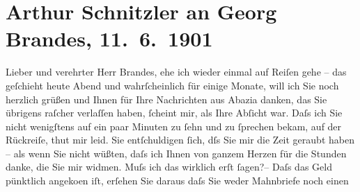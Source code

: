 

         
         \newcommand{\erwaehntePersonen}{Personen: Richard Beer-Hofmann, Georg Brandes, Fjodor Mihajlovič Dostojevskij, Édouard Dujardin}
         \newcommand{\erwaehnteOrte}{Orte: Hotel Guarnero, Salzburg, Villa Arnstein, Wien, Wörthersee}
         \newcommand{\erwaehnteWerke}{Werke: Der einsame Weg. Schauspiel in fünf Akten, Die Sanfte, Les lauriers sont coupés, Lieutenant Gustl. Novelle}
               \section[Arthur Schnitzler an Georg Brandes, 11. 6. 1901]{ Arthur Schnitzler an Georg Brandes, 11. 6. 1901}\nopagebreak{}\rehead{ }\begin{ledgroupsized}[t]{13cm}\normalsize\beginnumbering \toendnotes[C]{\smallbreak\pagebreak[2]} 
\toendnotes[C]{\smallbreak}\pstart{}{\pb}Lieber und verehrter Herr
                        Brandes,\pend\pstart
           ehe ich wieder einmal auf Reiſen gehe – das geſchieht heute Abend und
                    wahrſcheinlich für einige Monate, will ich Sie noch herzlich grüßen und Ihnen
                    für Ihre Nachrichten aus Abazia danken, das Sie
                    übrigens raſcher verlaſſen haben, ſcheint mir, als Ihre Abſicht war. Daſs ich
                    Sie {\pb}nicht wenigſtens auf ein paar
                    Minuten zu ſehn und zu ſprechen bekam, auf der Rückreiſe, thut mir leid. Sie
                    entſchuldigen ſich, dſs Sie mir die Zeit geraubt haben – als wenn Sie nicht
                    wüßten, daſs ich Ihnen von ganzem Herzen für die Stunden danke, die Sie mir
                    widmen. Muſs ich das wirklich erſt ſagen?– Daſs das Geld pünktlich angeko{\geminationm}en iſt, erſehen Sie daraus {\pb}daſs Sie weder Mahnbriefe noch einen

\end{ledgroupsized}
